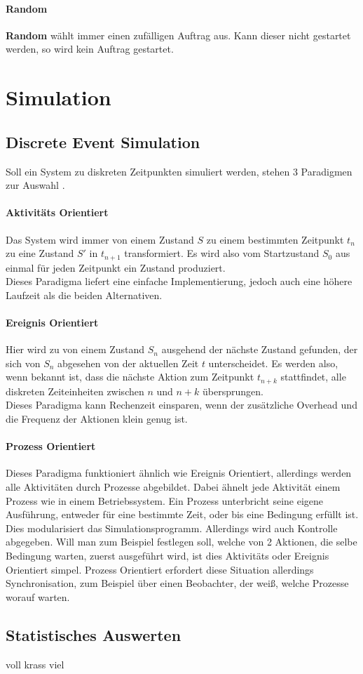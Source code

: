 \paragraph{Random}
\textbf{Random} wählt immer einen zufälligen Auftrag aus. Kann dieser nicht gestartet werden, so wird kein Auftrag gestartet.

\section{Simulation}

\subsection{Discrete Event Simulation}
Soll ein System zu diskreten Zeitpunkten simuliert werden, stehen 3 Paradigmen zur Auswahl \cite{SimPy}.
\label{paradigma}
\paragraph{Aktivitäts Orientiert}
\label{activity}
Das System wird immer von einem Zustand $S$ zu einem bestimmten Zeitpunkt $t_n$ zu eine Zustand $S'$ in $t_{n+1}$ transformiert. Es wird also vom Startzustand $S_0$ aus einmal für jeden Zeitpunkt ein Zustand produziert.\\
Dieses Paradigma liefert eine einfache Implementierung, jedoch auch eine höhere Laufzeit als die beiden Alternativen.
\paragraph{Ereignis Orientiert}
Hier wird zu von einem Zustand $S_n$ ausgehend der nächste Zustand gefunden, der sich von $S_n$ abgesehen von der aktuellen Zeit $t$ unterscheidet. Es werden also, wenn bekannt ist, dass die nächste Aktion zum Zeitpunkt $t_{n+k}$ stattfindet, alle diskreten Zeiteinheiten zwischen $n$ und $n+k$ übersprungen.\\
Dieses Paradigma kann Rechenzeit einsparen, wenn der zusätzliche Overhead und die Frequenz der Aktionen klein genug ist.
\paragraph{Prozess Orientiert}
Dieses Paradigma funktioniert ähnlich wie Ereignis Orientiert, allerdings werden alle Aktivitäten durch Prozesse abgebildet. Dabei ähnelt jede Aktivität einem Prozess wie in einem Betriebssystem. Ein Prozess unterbricht seine eigene Ausführung, entweder für eine bestimmte Zeit, oder bis eine Bedingung erfüllt ist.\\
Dies modularisiert das Simulationsprogramm. Allerdings wird auch Kontrolle abgegeben. Will man zum Beispiel festlegen soll, welche von 2 Aktionen, die selbe Bedingung warten, zuerst ausgeführt wird, ist dies Aktivitäts oder Ereignis Orientiert simpel. Prozess Orientiert erfordert diese Situation allerdings Synchronisation, zum Beispiel über einen Beobachter, der weiß, welche Prozesse worauf warten.



\subsection{Statistisches Auswerten}

voll krass viel
